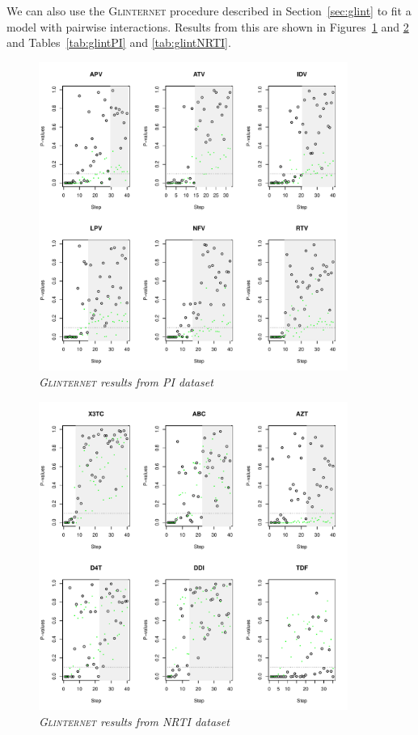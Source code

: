 \documentclass{imsart}
\begin{document}
We can also use the \textsc{Glinternet} procedure described in Section~\ref{sec:glint} to fit a model with pairwise interactions. Results from this are shown in Figures~\ref{fig:HIVPI:glint} and \ref{fig:HIVNRTI:glint} and Tables~\ref{tab:glintPI} and \ref{tab:glintNRTI}.

\begin{figure}
\begin{center}
\includegraphics[width=0.9\textwidth]{../figs/HIV_PI_glint.pdf}
\caption{\small \it \textsc{Glinternet} results from PI dataset}
\label{fig:HIVPI:glint}
\end{center}
\end{figure}

\begin{figure}
\begin{center}
\includegraphics[width=0.9\textwidth]{../figs/HIV_NRTI_glint.pdf}
\caption{\small \it \textsc{Glinternet} results from NRTI dataset}
\label{fig:HIVNRTI:glint}
\end{center}
\end{figure}
\end{document}
